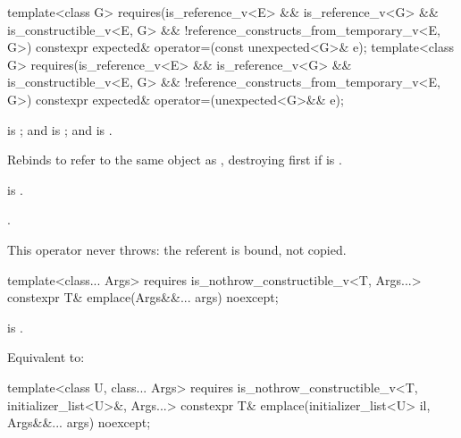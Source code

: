 %
\begin{itemdecl}
template<class G>
  requires(is_reference_v<E> && is_reference_v<G> && is_constructible_v<E, G> &&
           !reference_constructs_from_temporary_v<E, G>)
constexpr expected& operator=(const unexpected<G>& e);
template<class G>
  requires(is_reference_v<E> && is_reference_v<G> && is_constructible_v<E, G> &&
           !reference_constructs_from_temporary_v<E, G>)
constexpr expected& operator=(unexpected<G>&& e);
\end{itemdecl}

\begin{itemdescr}
\pnum
\constraints
{} is ; and  is ; and  is .

\pnum
\effects
Rebinds  to refer to the same object as , destroying  first if  is .

\pnum
\ensures
{} is .

\pnum
\returns
{}.

\pnum
\remarks
This operator never throws: the referent is bound, not copied.
\end{itemdescr}

%
\begin{itemdecl}
template<class... Args>
  requires is_nothrow_constructible_v<T, Args...>
constexpr T& emplace(Args&&... args) noexcept;
\end{itemdecl}

\begin{itemdescr}
\pnum
\constraints
{} is .

\pnum
\effects
Equivalent to: 
\end{itemdescr}

%
\begin{itemdecl}
template<class U, class... Args>
  requires is_nothrow_constructible_v<T, initializer_list<U>&, Args...>
constexpr T& emplace(initializer_list<U> il, Args&&... args) noexcept;
\end{itemdecl}

